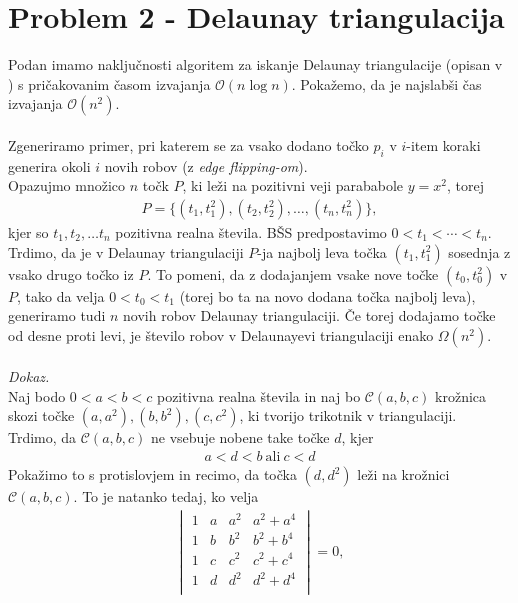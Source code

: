 \documentclass[a4paper,11pt]{article}
\begin{document}
\section*{Problem 2 - Delaunay triangulacija}
Podan imamo naključnosti algoritem za iskanje Delaunay triangulacije (opisan v \cite{delaunay}) s pričakovanim časom izvajanja $\mathcal{O}(n \log n)$. Pokažemo, da je najslabši čas izvajanja $\mathcal{O}(n^2)$.
\\
\\
Zgeneriramo primer, pri katerem se za vsako dodano točko $p_i$ v $i$-item koraki generira okoli $i$ novih robov (z \textit{edge flipping-om}).
\\
Opazujmo množico $n$ točk $P$, ki leži na pozitivni veji parababole $y = x^2$, torej
\begin{align*}
    P = \{ (t_1, t_1^2), (t_2, t_2^2), \ldots , (t_n, t_n^2)\},
\end{align*}
kjer so $t_1, t_2, \ldots t_n$ pozitivna realna števila. BŠS predpostavimo $0 < t_1 < \cdots < t_n$.
\\
Trdimo, da je v Delaunay triangulaciji $P$-ja najbolj leva točka $(t_1, t_1^2)$ sosednja z vsako drugo točko iz $P$. To pomeni, da z dodajanjem vsake nove točke $(t_0, t_0^2)$ v $P$, tako da velja $0 < t_0 < t_1$ (torej bo ta na novo dodana točka najbolj leva), generiramo tudi $n$ novih robov Delaunay triangulaciji. 
Če torej dodajamo točke od desne proti levi, je število robov v Delaunayevi triangulaciji enako $\Omega(n^2)$.
\\
\\
\textit{Dokaz.} \\
Naj bodo $0 < a < b < c$ pozitivna realna števila in naj bo $\mathcal{C}(a, b, c)$ krožnica skozi točke $(a, a^2), (b, b^2), (c, c^2)$, ki tvorijo trikotnik v triangulaciji.
\\
Trdimo, da $\mathcal{C}(a, b, c)$ ne vsebuje nobene take točke $d$, kjer
\begin{align*}
    a < d < b \ \text{ali} \ c < d
\end{align*} 
Pokažimo to s protislovjem in recimo, da točka $(d, d^2)$ leži na krožnici $\mathcal{C}(a, b, c)$. To je natanko tedaj, ko velja
\begin{align*}
    \begin{vmatrix}
        1 & a & a^2 & a^2 + a^4 \\
        1 & b & b^2 & b^2 + b^4 \\
        1 & c & c^2 & c^2 + c^4 \\
        1 & d & d^2 & d^2 + d^4 \\
    \end{vmatrix}
    = 0,
\end{align*}
\end{document}
